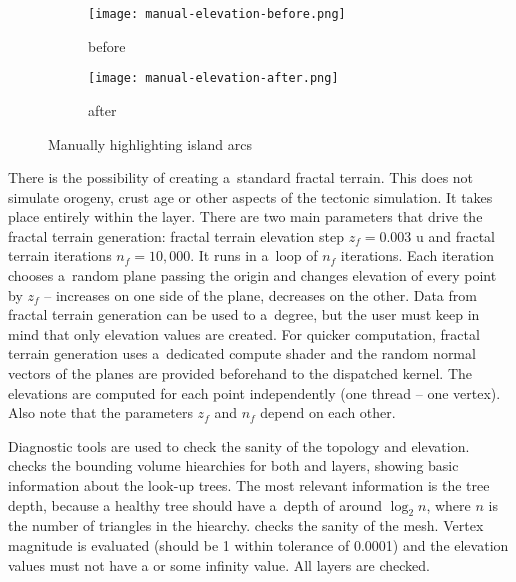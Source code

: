 \begin{figure}[ht]
\centering
\begin{subfigure}{7cm}
\texttt{[image: manual-elevation-before.png]}
\caption{before}
\label{fig:manual-elevation-before}
\end{subfigure}
\hspace*{1cm}
\begin{subfigure}{7cm}
\texttt{[image: manual-elevation-after.png]}
\caption{after}
\label{fig:manual-elevation-after}
\end{subfigure}
\caption{Manually highlighting island arcs}
\label{fig:manual-elevation}
\end{figure}

There is the possibility of creating a~standard fractal terrain. This does not simulate orogeny, crust age or other aspects of the tectonic simulation. It takes place entirely within the  layer. There are two main parameters that drive the fractal terrain generation: fractal terrain elevation step $z_f=0.003\mbox{ u}$ and fractal terrain iterations $n_f=10,000$. It runs in a~loop of $n_f$ iterations.  Each iteration chooses a~random plane passing the origin and changes elevation of every  point by $z_f$ -- increases on one side of the plane, decreases on the other. Data from fractal terrain generation can be used to a~degree, but the user must keep in mind that only elevation values are created. For quicker computation, fractal terrain generation uses a~dedicated compute shader and the random normal vectors of the planes are provided beforehand to the dispatched kernel. The elevations are computed for each point independently (one thread -- one vertex). Also note that the parameters $z_f$ and $n_f$ depend on each other.

Diagnostic tools are used to check the sanity of the topology and elevation.  checks the bounding volume hiearchies for both  and  layers, showing basic information about the look-up trees. The most relevant information is the tree depth, because a healthy tree should have a~depth of around $\log_2n$, where $n$ is the number of triangles in the hiearchy.  checks the sanity of the mesh. Vertex magnitude is evaluated (should be 1 within tolerance of 0.0001) and the elevation values must not have a  or some infinity value. All layers are checked.

